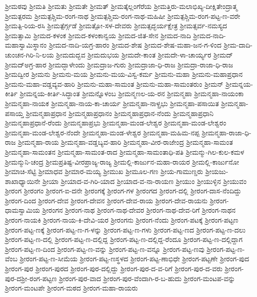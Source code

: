 ಶ್ರೀಮಠವು
ಶ್ರೀಮತಿ
ಶ್ರೀಮತು
ಶ್ರೀಮತೇ
ಶ್ರೀಮತ್
ಶ್ರೀಮತ್ಕೆಲ್ಲಂಗೆರೆಯ
ಶ್ರೀಮತ್ತಿರು-ಮಲಾಭಿಖ್ಯ-ದೀಕ್ಷಿತೇಂದ್ರಾತ್ಮ
ಶ್ರೀಮತ್ಪರಮ
ಶ್ರೀಮತ್ಪಶ್ಚಿಮ-ರಂಗ-ನಾಥ
ಶ್ರೀಮತ್ಪಶ್ಚಿಮ-ರಂಗ-ನಾಥ-ಮಹಿಷೀ
ಶ್ರೀಮತ್ಪಶ್ಚಿಮ-ರಂಗ-ಪಟ್ಟ-ಣ-ವರೇ
ಶ್ರೀಮತ್ಪಿ-ರಿಯ-ರಸಿ
ಶ್ರೀಮತ್ಪೆರ್ಗ್ಗಡೆ
ಶ್ರೀಮತ್ಪೋ-ಸಳ-ದೇವರು
ಶ್ರೀಮತ್ಸದ್ಭರ್ಯಕ್ಷೇತ್ರ
ಶ್ರೀಮತ್ಸರ್ವ-ನಮಸ್ಯದ
ಶ್ರೀಮತ್ಸಾಮಿ
ಶ್ರೀಮದ-ಕಳಂಕ
ಶ್ರೀಮದ-ಕಳಂಕಾನ್ವಯ
ಶ್ರೀಮದ-ಜಿತ-ಸೇನ
ಶ್ರೀಮದ-ನಾದಿ
ಶ್ರೀಮದ-ನಾದಿ-ಮಹಾಸ್ವಾಮಿಸ್ಥಾನಂ
ಶ್ರೀಮದ-ನಾದಿ-ಯಗ್ರ-ಹಾರಂ
ಶ್ರೀಮದ-ಶೇಷ
ಶ್ರೀಮದ-ಶೇಷ-ಮಹಾ-ಜನ-ಗ-ಳಿಂದ
ಶ್ರೀಮ-ದಾದಿ-ಚುಂಚನ-ಗಿರಿ-ನಿ-ಲಯ
ಶ್ರೀಮದುದ್ಭವ
ಶ್ರೀಮದುಭಯ
ಶ್ರೀಮದೇ-ಕಾಂತ
ಶ್ರೀಮದೇ-ಳಾ-ಚಾರ್ಯ್ಯರ
ಶ್ರೀಮದ್
ಶ್ರೀಮದ್ಅಗ್ರ-ಹಾರ
ಶ್ರೀಮದ್ಭಾಳೇಂದು
ಶ್ರೀಮದ್ರಾಜ-ಗುರು
ಶ್ರೀಮದ್ರಾಜಾ-ಧಿ-ರಾಜ
ಶ್ರೀಮದ್ರಾ-ರಾಜಾ-ಧಿ-ರಾಜ
ಶ್ರೀಮದ್ವೀರ
ಶ್ರೀಮನು
ಶ್ರೀಮನು-ಮಯ
ಶ್ರೀಮನು-ಮಯ-ವಿಸ್ವ-ಕರ್ಮ
ಶ್ರೀಮನು-ಮಹಾ
ಶ್ರೀಮನು-ಮಹಾಪ್ರಧಾನ
ಶ್ರೀಮನು-ಮಹಾ-ವಡ್ಡವ್ಯವ-ಹಾರಿ
ಶ್ರೀಮನು-ಮಹಾ-ಸಾಮಂತ
ಶ್ರೀಮನು-ಮಹಾ-ಸಾಮಂತರುಂ
ಶ್ರೀಮನ್
ಶ್ರೀಮನ್ನಯ-ಕೀರ್ತಿ
ಶ್ರೀಮನ್ನಯ-ಕೀರ್ತಿ-ಸಿದ್ಧಾಂತ
ಶ್ರೀಮನ್ನೊಳಂಬ
ಶ್ರೀಮನ್ಮಣಲ-ಯ-ರನ
ಶ್ರೀಮನ್ಮಹಾ
ಶ್ರೀಮನ್ಮಹಾ-ನಾಯಂಕಾ
ಶ್ರೀಮನ್ಮಹಾ-ನಾಯಕ
ಶ್ರೀಮನ್ಮಹಾ-ನಾಯ-ಕಾ-ಚಾರ್ಯ
ಶ್ರೀಮನ್ಮಹಾ-ನಾಳ್ಪ್ರಭು
ಶ್ರೀಮನ್ಮಹಾ-ಪಸಾಯಿತ
ಶ್ರೀಮನ್ಮಹಾ-ಪಸಾಯ್ತ
ಶ್ರೀಮನ್ಮಹಾಪ್ರಧಾನ
ಶ್ರೀಮನ್ಮಹಾಪ್ರಧಾನಂ
ಶ್ರೀಮನ್ಮಹಾಪ್ರಧಾನ-ನೆಂದು
ಶ್ರೀಮನ್ಮಹಾಪ್ರಧಾನಿ
ಶ್ರೀಮನ್ಮಹಾಪ್ರಧಾನೆ-ರೆಂದು
ಶ್ರೀಮನ್ಮಹಾಪ್ರಭು
ಶ್ರೀಮನ್ಮಹಾ-ಮಂಡ-ಲೇಶ್ವರ
ಶ್ರೀಮನ್ಮಹಾ-ಮಂಡ-ಲೇಶ್ವರಂ
ಶ್ರೀಮನ್ಮಹಾ-ಮಂಡ-ಲೇಶ್ವರ-ನೆಂದೇ
ಶ್ರೀಮನ್ಮಹಾ-ಮಂಡ-ಳೇಶ್ವರ
ಶ್ರೀಮನ್ಮಹಾ-ಮಹಿಮ-ನಪ್ಪ
ಶ್ರೀಮನ್ಮಹಾ-ರಾಜಾ-ಧಿ-ರಾಜ
ಶ್ರೀಮನ್ಮಹಾ-ರಾಯ
ಶ್ರೀಮನ್ಮಹಾ-ವಡ್ಡಬ್ಯವ-ಹಾರಿ
ಶ್ರೀಮನ್ಮಹಾ-ವೀರ-ರಾಜೇಂದ್ರ
ಶ್ರೀಮನ್ಮಹಾ-ಸಾಮಂತ
ಶ್ರೀಮನ್ಮಹಾ-ಸಾಮಂತನ
ಶ್ರೀಮನ್ಮಹಾ-ಸಾಮಂತ-ರಾದ
ಶ್ರೀಮನ್ಮಹಾ-ಸಾಮಂತಾಧಿ-ಪತಿ
ಶ್ರೀಮನ್ಮು-ಗಿಲ-ಕುಲ-ಕಮಳ
ಶ್ರೀಮನ್ಮುನಿ-ಚಂದ್ರ
ಶ್ರೀಮಪ್ರತಿಷ್ಟ-ವೀರಪ್ರಾಜ್ಯ-ರಾಜ್ಯ
ಶ್ರೀಮಲ್ಲಿ-ಕಾರ್ಜುನ-ಮಹಾ-ರಾಯರ
ಶ್ರೀಮಲ್ಲಿ-ಕಾರ್ಜುನೋ
ಶ್ರೀಮಾಚಿ-ಸೆಟ್ಟಿ
ಶ್ರೀಮಾಧವ
ಶ್ರೀಮಾರ-ಮಯ್ಯ
ಶ್ರೀಮುಖ
ಶ್ರೀಮೂಲ-ಗಣ
ಶ್ರೀಯ-ಗಾಮುಣ್ಡರು
ಶ್ರೀಯಜು-ಶಾಖಾಧ್ಯಾಯಿನೇ
ಶ್ರೀಯಾ
ಶ್ರೀಯಾದ-ವ-ಗಿರಿ-ಯಾದ
ಶ್ರೀಯಾದ-ವ-ನಾ-ರಾಯಣ
ಶ್ರೀಯುಂ
ಶ್ರೀಯುಳ್ಳಿನ
ಶ್ರೀಯುವಂ
ಶ್ರೀರಂಗ
ಶ್ರೀರಂಗಂ
ಶ್ರೀರಂಗ-ಐ-ದನೇ
ಶ್ರೀರಂಗಕ್ಕೆ
ಶ್ರೀರಂಗ-ಗಳ
ಶ್ರೀರಂಗದ
ಶ್ರೀರಂಗ-ದಲ್ಲಿ
ಶ್ರೀರಂಗ-ದಾಸ-ನೆಂದಿದ್ದು
ಶ್ರೀರಂಗ-ದಿಂದ
ಶ್ರೀರಂಗ-ದೇವ
ಶ್ರೀರಂಗ-ದೇವನ
ಶ್ರೀರಂಗ-ದೇವ-ರಾಯ
ಶ್ರೀರಂಗ-ದೇವ-ರಾಯನು
ಶ್ರೀರಂಗ-ಧಾಮಸ್ವಾಮಿಯ
ಶ್ರೀರಂಗನ
ಶ್ರೀರಂಗ-ನಾಥ
ಶ್ರೀರಂಗ-ನಾಥ-ದೇವರ
ಶ್ರೀರಂಗ-ನಾಥ-ದೇವ-ರಿಗೆ
ಶ್ರೀರಂಗ-ನಾಥನ
ಶ್ರೀರಂಗ-ನಾಯಕಿ
ಶ್ರೀರಂಗ-ನಾಯ-ಕಿ-ದೇವಿ-ಯರ
ಶ್ರೀರಂಗನು
ಶ್ರೀರಂಗ-ನೆಂದು
ಶ್ರೀರಂಗ-ಪಟಕ್ಕೆ
ಶ್ರೀರಂಗ-ಪಟ್ಟಣ
ಶ್ರೀರಂಗ-ಪಟ್ಟ-ಣಕ್ಕೆ
ಶ್ರೀರಂಗ-ಪಟ್ಟ-ಣ-ಗ-ಳನ್ನು
ಶ್ರೀರಂಗ-ಪಟ್ಟ-ಣ-ಗಳು
ಶ್ರೀರಂಗ-ಪಟ್ಟ-ಣದ
ಶ್ರೀರಂಗ-ಪಟ್ಟ-ಣ-ದಲು
ಶ್ರೀರಂಗ-ಪಟ್ಟ-ಣ-ದಲ್ಲಿ
ಶ್ರೀರಂಗ-ಪಟ್ಟ-ಣ-ದಲ್ಲಿದ್ದ
ಶ್ರೀರಂಗ-ಪಟ್ಟ-ಣ-ದಲ್ಲಿದ್ದ-ರೆಂದೂ
ಶ್ರೀರಂಗ-ಪಟ್ಟ-ಣ-ದಲ್ಲಿದ್ದಾಗ
ಶ್ರೀರಂಗ-ಪಟ್ಟ-ಣ-ದಿಂದ
ಶ್ರೀರಂಗ-ಪಟ್ಟ-ಣ-ವನ್ನು
ಶ್ರೀರಂಗ-ಪಟ್ಟ-ಣ-ವನ್ನೂ
ಶ್ರೀರಂಗ-ಪಟ್ಟ-ಣವು
ಶ್ರೀರಂಗ-ಪಟ್ಟ-ಣ-ವೆಂಬ
ಶ್ರೀರಂಗ-ಪಟ್ಟ-ಣ-ಸೀಮೆಯ
ಶ್ರೀರಂಗ-ಪಟ್ಟ-ಣಸ್ಥಳದ
ಶ್ರೀರಂಗ-ಪಟ್ಟ-ಣಾಭಿಧೇ
ಶ್ರೀರಂಗ-ಪಟ್ಟಣೇ
ಶ್ರೀರಂಗ-ಪುದ
ಶ್ರೀರಂಗ-ಪುರ
ಶ್ರೀರಂಗ-ಪುರದ
ಶ್ರೀರಂಗ-ಪುರ-ದಲ್ಲಿದ್ದು
ಶ್ರೀರಂಗ-ಪುರ-ದ-ವ-ರಿಗೆ
ಶ್ರೀರಂಗ-ಪುರ-ದ-ವರು
ಶ್ರೀರಂಗ-ಪುರ-ದಶ್ರೀ-ರಂಗ-ಪಟ್ಟಣ
ಶ್ರೀರಂಗ-ಪುರ-ವಾದ
ಶ್ರೀರಂಗ-ಪುರ-ವೆಂದಾಗಿ-ರ-ಬ-ಹುದು
ಶ್ರೀರಂಗ-ಮಂಟಪ-ವನ್ನು
ಶ್ರೀರಂಗ-ಮಂಟಪೇ
ಶ್ರೀರಂಗ-ಮಠದ
ಶ್ರೀರಂಗ-ಮಹಾ-ರಾಯರು
